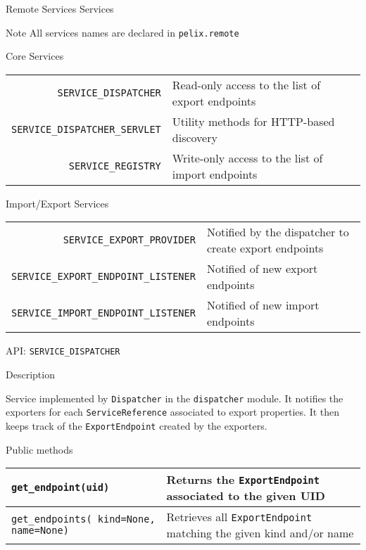 \begin{frame}{Remote Services Services}
\begin{exampleblock}{Note}
All services names are declared in \texttt{pelix.remote}
\end{exampleblock}

\begin{block}{Core Services}
\begin{small}
\begin{tabular}{rp{}}
\texttt{\scriptsize SERVICE\_DISPATCHER} & Read-only access to the list of export endpoints \\
\texttt{\scriptsize SERVICE\_DISPATCHER\_SERVLET} & Utility methods for HTTP-based discovery \\
\texttt{\scriptsize SERVICE\_REGISTRY} & Write-only access to the list of import endpoints \\
\end{tabular}
\end{small}
\end{block}

\begin{block}{Import/Export Services}
\begin{small}
\begin{tabular}{rp{}}
\texttt{\scriptsize SERVICE\_EXPORT\_PROVIDER} & Notified by the dispatcher to create export endpoints \\
\texttt{\scriptsize SERVICE\_EXPORT\_ENDPOINT\_LISTENER} & Notified of new export endpoints \\
\texttt{\scriptsize SERVICE\_IMPORT\_ENDPOINT\_LISTENER} & Notified of new import endpoints \\
\end{tabular}
\end{small}
\end{block}
\end{frame}

\begin{frame}{API: \texttt{SERVICE\_DISPATCHER}}
\begin{block}{Description}
\begin{small}
Service implemented by \texttt{Dispatcher} in the \texttt{dispatcher} module.
It notifies the exporters for each \texttt{ServiceReference} associated to export properties.
It then keeps track of the \texttt{ExportEndpoint} created by the exporters.
\end{small}
\end{block}

\begin{block}{Public methods}
\begin{small}
\begin{tabular}{p{13em} p{}}
\texttt{get\_endpoint(uid)} & Returns the \texttt{ExportEndpoint} associated to the given UID \\
\hline
\texttt{get\_endpoints( kind=None, name=None)} & Retrieves all \texttt{ExportEndpoint} matching the given kind and/or name \\
\end{tabular}
\end{small}
\end{block}
\end{frame}

